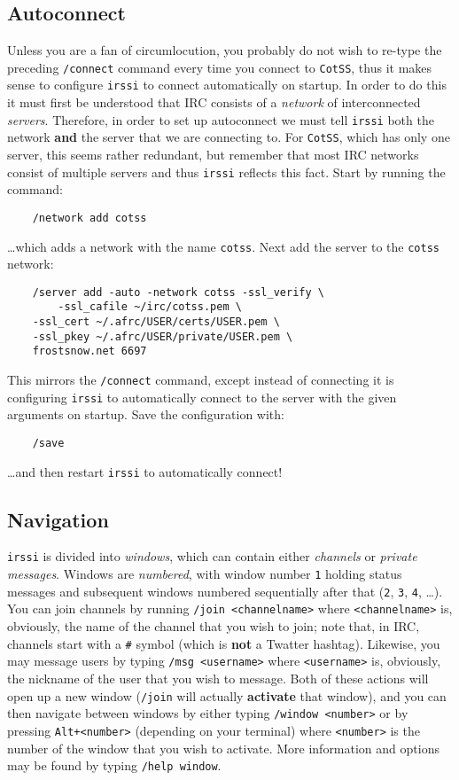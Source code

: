\documentclass{article}
\begin{document}
{\subsection{Autoconnect}
Unless you are a fan of circumlocution, you probably do not wish to re-type the preceding \texttt{/connect} command every time you connect to \texttt{CotSS}, thus it makes sense to configure \texttt{irssi} to connect automatically on startup.  In order to do this it must first be understood that IRC consists of a \textit{network} of interconnected \textit{servers}.  Therefore, in order to set up autoconnect we must tell \texttt{irssi} both the network \textbf{and} the server that we are connecting to.  For \texttt{CotSS}, which has only one server, this seems rather redundant, but remember that most IRC networks consist of multiple servers and thus \texttt{irssi} reflects this fact.  Start by running the command:
\begin{lstlisting}
    /network add cotss
\end{lstlisting}
\ldots which adds a network with the name \texttt{cotss}.  Next add the server to the \texttt{cotss} network:
\begin{lstlisting}
    /server add -auto -network cotss -ssl_verify \
        -ssl_cafile ~/irc/cotss.pem \
	-ssl_cert ~/.afrc/USER/certs/USER.pem \
	-ssl_pkey ~/.afrc/USER/private/USER.pem \
	frostsnow.net 6697
\end{lstlisting}
This mirrors the \texttt{/connect} command, except instead of connecting it is configuring \texttt{irssi} to automatically connect to the server with the given arguments on startup.  Save the configuration with:
\begin{lstlisting}
    /save
\end{lstlisting}
\ldots and then restart \texttt{irssi} to automatically connect!

\subsection{Navigation}
\texttt{irssi} is divided into \textit{windows}, which can contain either \textit{channels} or \textit{private messages}.  Windows are \textit{numbered}, with window number \texttt{1} holding status messages and subsequent windows numbered sequentially after that (\texttt{2}, \texttt{3}, \texttt{4}, \ldots).  You can join channels by running \texttt{/join <channelname>} where \texttt{<channelname>} is, obviously, the name of the channel that you wish to join; note that, in IRC, channels start with a \texttt{\#} symbol (which is \textbf{not} a Twatter hashtag).  Likewise, you may message users by typing \texttt{/msg <username>} where \texttt{<username>} is, obviously, the nickname of the user that you wish to message.  Both of these actions will open up a new window (\texttt{/join} will actually \textbf{activate} that window), and you can then navigate between windows by either typing \texttt{/window <number>} or by pressing \texttt{Alt+<number>} (depending on your terminal) where \texttt{<number>} is the number of the window that you wish to activate.  More information and options may be found by typing \texttt{/help window}.

}
\end{document}
